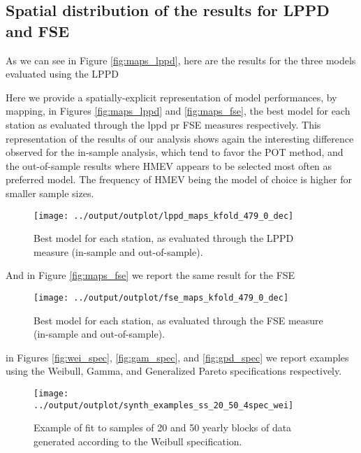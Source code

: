 \documentclass[]{article}
\begin{document}
\hypertarget{spatial-distribution-of-the-results-for-lppd-and-fse}{%
\subsection{Spatial distribution of the results for LPPD and
FSE}\label{spatial-distribution-of-the-results-for-lppd-and-fse}}

As we can see in Figure \ref{fig:maps_lppd}, here are the results for
the three models evaluated using the LPPD

Here we provide a spatially-explicit representation of model
performances, by mapping, in Figures \ref{fig:maps_lppd} and
\ref{fig:maps_fse}, the best model for each station as evaluated through
the lppd pr FSE measures respectively. This representation of the
results of our analysis shows again the interesting difference observed
for the in-sample analysis, which tend to favor the POT method, and the
out-of-sample results where HMEV appears to be selected most often as
preferred model. The frequency of HMEV being the model of choice is
higher for smaller sample sizes.

\begin{figure}
\texttt{[image: ../output/outplot/lppd\_maps\_kfold\_479\_0\_dec]} \caption{Best model for each station, as evaluated through the LPPD measure (in-sample and out-of-sample).\label{fig:maps_lppd}}\label{fig:maps1}
\end{figure}

And in Figure \ref{fig:maps_fse} we report the same result for the FSE

\begin{figure}
\texttt{[image: ../output/outplot/fse\_maps\_kfold\_479\_0\_dec]} \caption{Best model for each station, as evaluated through the FSE measure (in-sample and out-of-sample).\label{fig:maps_fse}}\label{fig:maps2}
\end{figure}

in Figures \ref{fig:wei_spec}, \ref{fig:gam_spec}, and
\ref{fig:gpd_spec} we report examples using the Weibull, Gamma, and
Generalized Pareto specifications respectively.

\begin{figure}
\texttt{[image: ../output/outplot/synth\_examples\_ss\_20\_50\_4spec\_wei]} \caption{Example of fit to samples of 20 and 50 yearly blocks of data generated according to the Weibull specification.\label{fig:wei_spec}}\label{fig:wei}
\end{figure}
\end{document}
